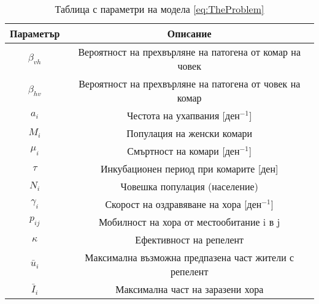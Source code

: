 \begin{table}[h]
  \centering
  \begin{tabular}{ |c||c| }
    \hline
    Параметър & Описание\\
    \hline
    $\beta_{vh}$ & Вероятност на прехвърляне на патогена от комар на човек \\
    $\beta_{hv}$ & Вероятност на прехвърляне на патогена от човек на комар \\
    $a_i$ & Честота на ухапвания [$\text{ден}^{-1}$]\\
    $M_i$ & Популация на женски комари\\
    $\mu_i$ & Смъртност на комари [$\text{ден}^{-1}$]\\
    $\tau$ & Инкубационен период при комарите [$\text{ден}$]\\
    $N_i$ & Човешка популация (население) \\
    $\gamma_i$ & Скорост на оздравяване на хора [$\text{ден}^{-1}$]\\
    $p_{ij}$ & Мобилност на хора от местообитание i в j\\
    $\kappa$ & Ефективност на репелент\\
    $\bar{u}_i$ & Максимална възможна предпазена част жители с репелент\\
    $\bar{I}_i$ & Максимална част на заразени хора\\
    \hline
  \end{tabular}
  \caption{Таблица с параметри на модела \eqref{eq:TheProblem}}
  \label{tbl:ParameterDefinitions}
\end{table}


